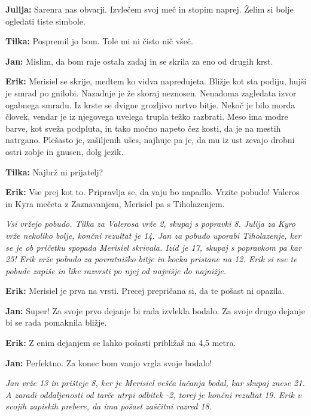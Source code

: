 \textbf{Julija:} Sarenra nas obvarji. Izvlečem svoj meč in stopim naprej. Želim si bolje ogledati tiste simbole.

\textbf{Tilka:} Pospremil jo bom. Tole mi ni čisto nič všeč.

\textbf{Jan:} Mislim, da bom raje ostala zadaj in se skrila za eno od drugih krst.

\textbf{Erik:} Merisiel se skrije, medtem ko vidva napredujeta. Bližje kot sta podiju, hujši je smrad po gnilobi. Nazadnje je že skoraj neznosen. Nenadoma zagledata izvor ogabnega smradu. Iz krste se dvigne grozljivo mrtvo bitje. Nekoč je bilo morda človek, vendar je iz njegovega uvelega trupla težko razbrati. Meso ima modre barve, kot sveža podpluta, in tako močno napeto čez kosti, da je na mestih natrgano. Plešasto je, zašiljenih ušes, najhuje pa je, da mu iz ust zevajo drobni ostri zobje in gnusen, dolg jezik.

\textbf{Tilka:} Najbrž ni prijatelj?

\textbf{Erik:} Vse prej kot to. Pripravlja se, da vaju bo napadlo. Vrzite pobudo! Valeros in Kyra mečeta z Zaznavanjem, Merisiel pa s Tiholazenjem.

\vspace{20pt}
\textit{Vsi vržejo pobudo. Tilka za Valerosa vrže 2, skupaj s popravki 8. Julija za Kyro vrže nekoliko bolje, končni rezultat je 14. Jan za pobudo uporabi Tiholazenje, ker se je ob pričetku spopada Merisiel skrivala. Izid je 17, skupaj s popravkom pa kar 25! Erik vrže pobudo za povratniško bitje in kocka pristane na 12. Erik si vse te pobude zapiše in like razvrsti po njej od najvišje do najnižje.}
\vspace{20pt}

\textbf{Erik:} Merisiel je prva na vrsti. Precej prepričana si, da te pošast ni opazila.

\textbf{Jan:} Super! Za svoje prvo dejanje bi rada izvlekla bodalo. Za svoje drugo dejanje bi se rada pomaknila bližje.

\textbf{Erik:} Z enim dejanjem se lahko pošasti približaš na 4,5 metra.

\textbf{Jan:} Perfektno. Za konec bom vanjo vrgla svoje bodalo!

\vspace{20pt}
\textit{Jan vrže 13 in prišteje 8, ker je Merisiel vešča lučanja bodal, kar skupaj znese 21. A zaradi oddaljenosti od tarče utrpi odbitek -2, torej je končni rezultat 19. Erik v svojih zapiskih prebere, da ima pošast zaščitni razred 18.}
\vspace{20pt}

